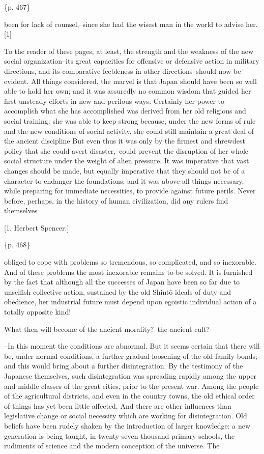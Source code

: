 \{p. 467\}

been for lack of counsel,--since she had the wisest man in the world to advise her.[1]



To the reader of these pages, at least, the strength and the weakness of the new social organization--its great capacities for offensive or defensive action in military directions, and its comparative feebleness in other directions--should now be evident. All things considered, the marvel is that Japan should have been so well able to hold her own; and it was assuredly no common wisdom that guided her first unsteady efforts in new and perilous ways. Certainly her power to accomplish what she has accomplished was derived from her old religious and social training: she was able to keep strong because, under the new forms of rule and the new conditions of social activity, she could still maintain a great deal of the ancient discipline But even thus it was only by the firmest and shrewdest policy that she could avert disaster,--could prevent the disruption of her whole social structure under the weight of alien pressure. It was imperative that vast changes should be made, but equally imperative that they should not be of a character to endanger the foundations; and it was above all things necessary, while preparing for immediate necessities, to provide against future perils. Never before, perhaps, in the history of human civilization, did any rulers find themselves

[1. Herbert Spencer.]

\{p. 468\}

obliged to cope with problems so tremendous, so complicated, and so inexorable. And of these problems the most inexorable remains to be solved. It is furnished by the fact that although all the successes of Japan have been so far due to unselfish collective action, sustained by the old Shintô ideals of duty and obedience, her industrial future must depend upon egoistic individual action of a totally opposite kind!


What then will become of the ancient morality?--the ancient cult?

--In this moment the conditions are abnormal. But it seems certain that there will be, under normal conditions, a further gradual loosening of the old family-bonds; and this would bring about a further disintegration. By the testimony of the Japanese themselves, such disintegration was spreading rapidly among the upper and middle classes of the great cities, prior to the present war. Among the people of the agricultural districts, and even in the country towns, the old ethical order of things has yet been little affected. And there are other influences than legislative change or social necessity which are working for disintegration. Old beliefs have been rudely shaken by the introduction of larger knowledge: a new generation is being taught, in twenty-seven thousand primary schools, the rudiments of science and the modern conception of the universe. The

